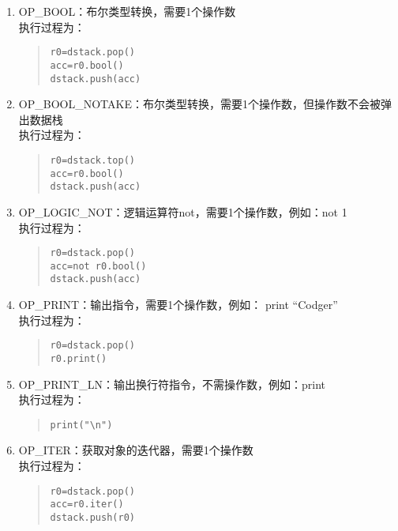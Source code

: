 \begin{enumerate}
\item OP\_BOOL：布尔类型转换，需要1个操作数\\
执行过程为：
\begin{quote}
\begin{verbatim}
r0=dstack.pop()
acc=r0.bool()
dstack.push(acc)
\end{verbatim}
\end{quote}

\item OP\_BOOL\_NOTAKE：布尔类型转换，需要1个操作数，但操作数不会被弹出数据栈\\
执行过程为：
\begin{quote}
\begin{verbatim}
r0=dstack.top()
acc=r0.bool()
dstack.push(acc)
\end{verbatim}
\end{quote}

\item OP\_LOGIC\_NOT：逻辑运算符not，需要1个操作数，例如：not 1 \\
执行过程为：
\begin{quote}
\begin{verbatim}
r0=dstack.pop()
acc=not r0.bool()
dstack.push(acc)
\end{verbatim}
\end{quote}

\item OP\_PRINT：输出指令，需要1个操作数，例如： print ``Codger'' \\
执行过程为：
\begin{quote}
\begin{verbatim}
r0=dstack.pop()
r0.print()
\end{verbatim}
\end{quote}

\item OP\_PRINT\_LN：输出换行符指令，不需操作数，例如：print \\
执行过程为：
\begin{quote}
\begin{verbatim}
print("\n")
\end{verbatim}
\end{quote}

\item OP\_ITER：获取对象的迭代器，需要1个操作数 \\
执行过程为：
\begin{quote}
\begin{verbatim}
r0=dstack.pop()
acc=r0.iter()
dstack.push(r0)
\end{verbatim}
\end{quote}


\end{enumerate}
